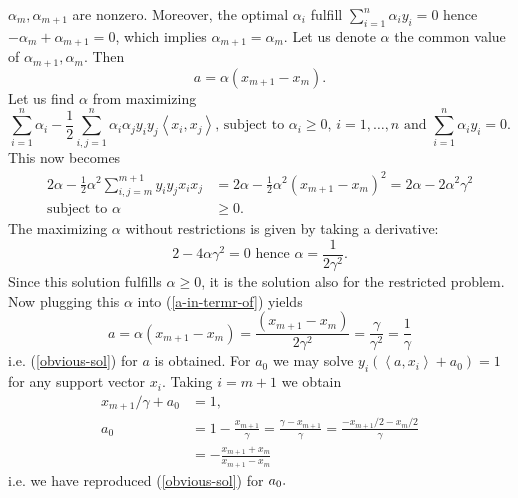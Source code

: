 \documentclass[11pt,twoside]{article}%
\theoremstyle{change}
\begin{document}
$\alpha_{m},\alpha_{m+1}$ are nonzero. Moreover, the optimal $\alpha_{i}$
fulfill $\sum_{i=1}^{n}\alpha_{i}y_{i}=0$ hence $-\alpha_{m}+\alpha_{m+1}=0$,
which implies $\alpha_{m+1}=\alpha_{m}$. Let us denote $\alpha$ the common
value of $\alpha_{m+1},\alpha_{m}$. Then
\begin{equation}
a=\alpha\left(  x_{m+1}-x_{m}\right)  .\label{a-in-termr-of}%
\end{equation}
Let us find $\alpha$ from maximizing%
\begin{equation}
\sum_{i=1}^{n}\alpha_{i}-\frac{1}{2}\sum_{i,j=1}^{n}\alpha_{i}\alpha_{j}%
y_{i}y_{j}\left\langle x_{i},x_{j}\right\rangle \text{, subject to }\alpha
_{i}\geq0\text{, }i=1,\ldots,n\text{ and }\sum_{i=1}^{n}\alpha_{i}%
y_{i}=0.\label{maxim-2}%
\end{equation}
This now becomes
\begin{align*}
2\alpha-\frac{1}{2}\alpha^{2}\sum_{i,j=m}^{m+1}y_{i}y_{j}x_{i}x_{j}  &
=2\alpha-\frac{1}{2}\alpha^{2}\left(  x_{m+1}-x_{m}\right)  ^{2}%
=2\alpha-2\alpha^{2}\gamma^{2}\\
\text{subject to }\alpha & \geq0.
\end{align*}
The maximizing $\alpha$ without restrictions is given by taking a derivative:
\[
2-4\alpha\gamma^{2}=0\text{ hence }\alpha=\frac{1}{2\gamma^{2}}.
\]
Since this solution fulfills $\alpha\geq0$, it is the solution also for the
restricted problem. Now plugging this $\alpha$ into (\ref{a-in-termr-of})
yields
\[
a=\alpha\left(  x_{m+1}-x_{m}\right)  =\frac{\left(  x_{m+1}-x_{m}\right)
}{2\gamma^{2}}=\frac{\gamma}{\gamma^{2}}=\frac{1}{\gamma}%
\]
i.e. (\ref{obvious-sol}) for $a$ is obtained. For $a_{0}$ we may solve
$y_{i}\left(  \left\langle a,x_{i}\right\rangle +a_{0}\right)  =1$ for any
support vector $x_{i}$. Taking $i=m+1$ we obtain
\begin{align*}
x_{m+1}/\gamma+a_{0}  & =1,\\
a_{0}  & =1-\frac{x_{m+1}}{\gamma}=\frac{\gamma-x_{m+1}}{\gamma}%
=\frac{-x_{m+1}/2-x_{m}/2}{\gamma}\\
& =-\frac{x_{m+1}+x_{m}}{x_{m+1}-x_{m}}%
\end{align*}
i.e. we have reproduced (\ref{obvious-sol}) for $a_{0}.\bigskip\bigskip$
\end{document}
